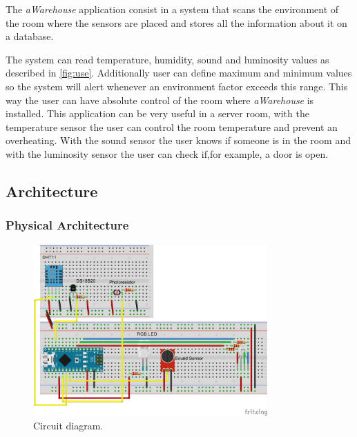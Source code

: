 \documentclass[12pt]{report}
\begin{document}
The \textit{aWarehouse} application consist in a system that scans the environment of the room where the sensors are placed and stores all the information about it on a database.

The system can read temperature, humidity, sound and luminosity values as described in \ref{fig:use}. Additionally user can define maximum and minimum values so the system will alert whenever an environment factor exceeds this range.
This way the user can have absolute control of the room where \textit{aWarehouse} is installed. This application can be very useful in a server room, with the temperature sensor the user can control the room temperature and prevent an overheating. With the sound sensor the user knows if someone is in the room and with the luminosity sensor the user can check if,for example, a door is open.



\subsection{Architecture}

\subsubsection{Physical Architecture}

\begin{figure}[H]
    \centering
    \includegraphics[width=0.8\textwidth]{schematics.png}
    \caption{Circuit diagram.}
    \label{fig:circ}
\end{figure}
\end{document}
